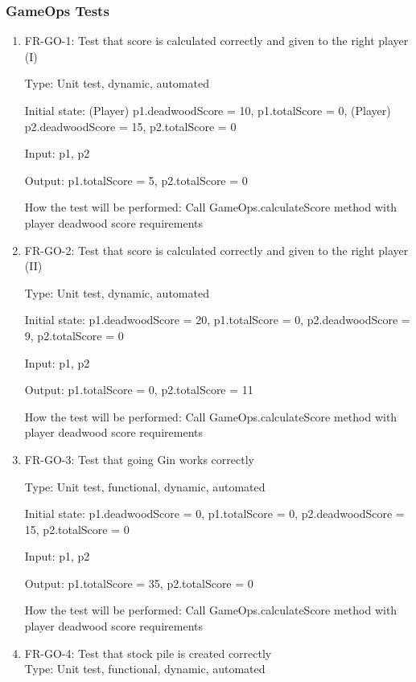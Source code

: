 \documentclass[12pt, titlepage]{article}
\begin{document}
\subsubsection{GameOps Tests}
\begin{enumerate}
    \item{FR-GO-1: Test that score is calculated correctly and given to the right player (I)\\}
    
    Type: Unit test, dynamic, automated
    
    Initial state: (Player) p1.deadwoodScore = 10, p1.totalScore = 0, (Player) p2.deadwoodScore = 15, p2.totalScore = 0
    
    Input: p1, p2
    
    Output: p1.totalScore = 5, p2.totalScore = 0
    
    How the test will be performed: Call GameOps.calculateScore method with player deadwood score requirements
    
    \item{FR-GO-2: Test that score is calculated correctly and given to the right player (II)\\}
    
    Type: Unit test, dynamic, automated
    
    Initial state: p1.deadwoodScore = 20, p1.totalScore = 0, p2.deadwoodScore = 9, p2.totalScore = 0
    
    Input: p1, p2
    
    Output: p1.totalScore = 0, p2.totalScore = 11
    
    How the test will be performed: Call GameOps.calculateScore method with player deadwood score requirements
    
    \item{FR-GO-3: Test that going Gin works correctly}
    
    Type: Unit test, functional, dynamic, automated
    
    Initial state: p1.deadwoodScore = 0, p1.totalScore = 0, p2.deadwoodScore = 15, p2.totalScore = 0
    
    Input: p1, p2
    
    Output: p1.totalScore = 35, p2.totalScore = 0
    
    How the test will be performed: Call GameOps.calculateScore method with player deadwood score requirements
    
    \item{FR-GO-4: Test that stock pile is created correctly\\}
    Type: Unit test, functional, dynamic, automated
    

\end{enumerate}
\end{document}
